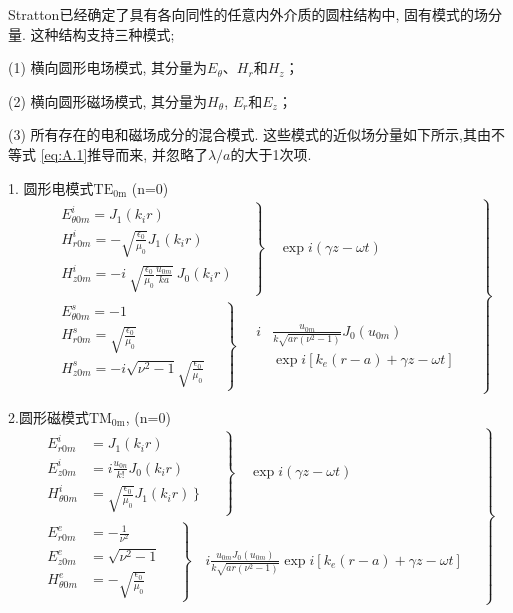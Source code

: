 \documentclass[14pt,a4paper,oneside]{article}
\numberwithin{equation}{subsection}             %
\numberwithin{figure}{subsection}               %
\begin{document}
Stratton已经确定了具有各向同性的任意内外介质的圆柱结构中, 固有模式的场分量. 这种结构支持三种模式; 

(1) 横向圆形电场模式, 其分量为$E_{\theta}$、$H_r$和$H_z$；

(2) 横向圆形磁场模式, 其分量为$H_\theta$, $E_r$和$E_z$；

(3) 所有存在的电和磁场成分的混合模式. 这些模式的近似场分量如下所示,其由不等式 \ref{eq:A.1}推导而来, 并忽略了$\lambda/a$的大于1次项. 

1. 圆形电模式$\mathrm{TE_{0m}}$ (n=0)
\begin{equation}
    \left.\begin{aligned}
        &\left.\begin{aligned}&{E^i_{\theta0m}}=J_1(k_ir)\\&{H^i_{r0m}}=-\sqrt{\frac{\epsilon_0}{\mu_0}}J_1(k_ir)\\&{H^i_{z0m}}=-i\:\sqrt{\frac{\epsilon_0}{\mu_0}\frac{u_{0m}}{ka}}\:J_0(k_ir)\end{aligned}\quad\right\}\quad\exp i(\gamma z-\omega t)\\
        &\left.\begin{aligned}&E^s_{\theta0m}=-1\\&{H^s_{r0m}}=\sqrt{\frac{\epsilon_0}{\mu_0}}\\&{H^s_{z0m}}=-i\left.\sqrt{\nu^2-1}\right.\sqrt{\frac{\epsilon_0}{\mu_0}}\end{aligned}\quad\right\}\quad\begin{aligned}i&\frac{u_{0m}}{k\sqrt{ar(\nu^2-1)}}J_0(u_{0m})\\&\exp i[k_e(r-a)+\gamma z-\omega t]\end{aligned}
    \end{aligned}\quad\right\}
    \label{eq:A.3}
\end{equation}

2.圆形磁模式$\mathrm{TM_{0m}}$,  (n=0)
\begin{equation}
    \left.\begin{aligned}
        &\left.\begin{aligned}
            E_{r0m}^i&=J_1(k_ir)\\
            E_{z0m}^i&=i\frac{u_{0n}}{k!}J_0(k_ir)\\
            H_{\theta0m}^i&=\sqrt{\frac{\epsilon_0}{\mu_0}}\left.J_1(k_ir)\right\}\end{aligned}\quad\right\}\quad\exp i(\gamma z-\omega t)\\
        &\left.\begin{aligned}
            E_{r0m}^e&=-\frac1{\nu^2}\\
            E_{z0m}^e&=\sqrt{\nu^2-1}\\
            H_{\theta0m}^e&=-\sqrt{\frac{\epsilon_0}{\mu_0}}
        \end{aligned}\quad\right\}\quad i\frac{u_{0m}J_0(u_{0m})}{k\sqrt{ar(\nu^2-1)}}\exp i\left[k_e(r-a)+\gamma z-\omega t\right]
    \end{aligned}\quad\right\}
    \label{eq:A.4}
\end{equation}
\end{document}
